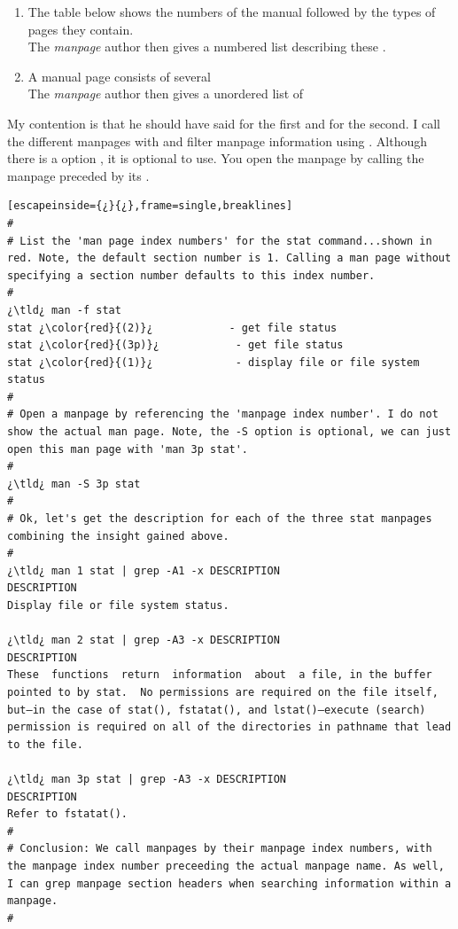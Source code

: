 \begin{enumerate}
	\item{The table below shows the  numbers of the manual followed by the types of pages they contain.}\\
	The  \emph{manpage} author then gives a numbered list describing these .
	\item{A manual page consists of several }\\
	The  \emph{manpage} author then gives a unordered list of 
\end{enumerate}

My contention is that he should have said  for the first and  for the second. I call the different manpages with  and filter manpage information using . Although there is a  option , it is optional to use. You open the manpage by calling the manpage preceded by its .

\begin{lstlisting}[escapeinside={¿}{¿},frame=single,breaklines]
#
# List the 'man page index numbers' for the stat command...shown in red. Note, the default section number is 1. Calling a man page without specifying a section number defaults to this index number.
#
¿\tld¿ man -f stat
stat ¿\color{red}{(2)}¿            - get file status
stat ¿\color{red}{(3p)}¿            - get file status
stat ¿\color{red}{(1)}¿             - display file or file system status
#
# Open a manpage by referencing the 'manpage index number'. I do not show the actual man page. Note, the -S option is optional, we can just open this man page with 'man 3p stat'.
#
¿\tld¿ man -S 3p stat
#
# Ok, let's get the description for each of the three stat manpages combining the insight gained above.
#
¿\tld¿ man 1 stat | grep -A1 -x DESCRIPTION
DESCRIPTION
Display file or file system status.

¿\tld¿ man 2 stat | grep -A3 -x DESCRIPTION
DESCRIPTION
These  functions  return  information  about  a file, in the buffer pointed to by stat.  No permissions are required on the file itself, but—in the case of stat(), fstatat(), and lstat()—execute (search)  permission is required on all of the directories in pathname that lead to the file.

¿\tld¿ man 3p stat | grep -A3 -x DESCRIPTION
DESCRIPTION
Refer to fstatat().
#
# Conclusion: We call manpages by their manpage index numbers, with the manpage index number preceeding the actual manpage name. As well, I can grep manpage section headers when searching information within a manpage.
#
\end{lstlisting}

